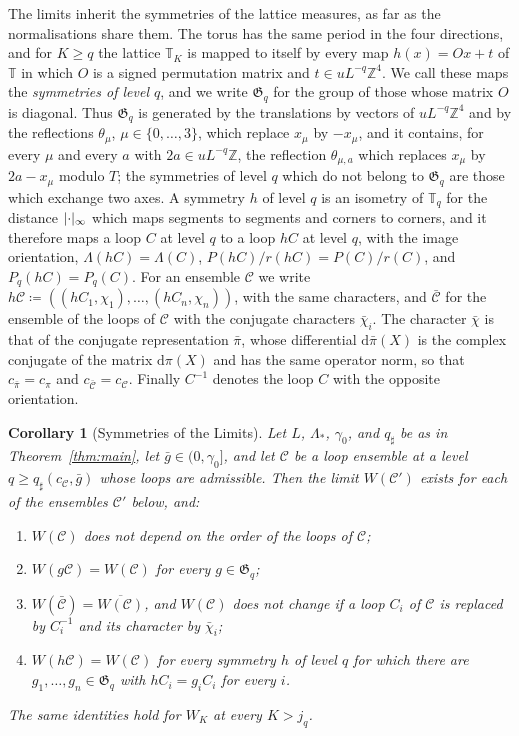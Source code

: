 \documentclass[11pt]{preprint}
\newcommand{\dd}{\mathrm{d}}
\DeclarePairedDelimiter{\abs}{\lvert}{\rvert}
\numberwithin{equation}{section}
\newtheorem{corollary}[theorem]{Corollary}
\theoremstyle{definition}
\theoremstyle{remark}
\theoremstyle{plain}
\begin{document}
The limits inherit the symmetries of the lattice measures, as far as the normalisations share them. The torus has the same period in the four directions, and for $K \geq q$ the lattice $\mathbb T_K$ is mapped to itself by every map $h(x) = Ox + t$ of $\mathbb T$ in which $O$ is a signed permutation matrix and $t \in uL^{-q}\mathbb Z^4$. We call these maps the \emph{symmetries of level $q$}, and we write $\mathfrak G_q$ for the group of those whose matrix $O$ is diagonal. Thus $\mathfrak G_q$ is generated by the translations by vectors of $uL^{-q}\mathbb Z^4$ and by the reflections $\theta_\mu$, $\mu \in \{ 0, \dots, 3 \}$, which replace $x_\mu$ by $-x_\mu$, and it contains, for every $\mu$ and every $a$ with $2a \in uL^{-q}\mathbb Z$, the reflection $\theta_{\mu,a}$ which replaces $x_\mu$ by $2a - x_\mu$ modulo $T$; the symmetries of level $q$ which do not belong to $\mathfrak G_q$ are those which exchange two axes. A symmetry $h$ of level $q$ is an isometry of $\mathbb T_q$ for the distance $\abs{\cdot}_\infty$ which maps segments to segments and corners to corners, and it therefore maps a loop $C$ at level $q$ to a loop $hC$ at level $q$, with the image orientation, $\Lambda(hC) = \Lambda(C)$, $P(hC)/r(hC) = P(C)/r(C)$, and $P_q(hC) = P_q(C)$. For an ensemble $\mathcal C$ we write $h\mathcal C \coloneqq ((hC_1, \chi_1), \dots, (hC_n, \chi_n))$, with the same characters, and $\bar{\mathcal C}$ for the ensemble of the loops of $\mathcal C$ with the conjugate characters $\bar\chi_i$. The character $\bar\chi$ is that of the conjugate representation $\bar\pi$, whose differential $\dd\bar\pi(X)$ is the complex conjugate of the matrix $\dd\pi(X)$ and has the same operator norm, so that $c_{\bar\pi} = c_\pi$ and $c_{\bar{\mathcal C}} = c_{\mathcal C}$. Finally $C^{-1}$ denotes the loop $C$ with the opposite orientation.

\begin{corollary}[Symmetries of the Limits]\label{cor:symmetries}
Let $L$, $\Lambda_*$, $\gamma_0$, and $q_\sharp$ be as in Theorem~\ref{thm:main}, let $\bar g \in (0, \gamma_0]$, and let $\mathcal C$ be a loop ensemble at a level $q \geq q_\sharp(c_{\mathcal C}, \bar g)$ whose loops are admissible. Then the limit $W(\mathcal C')$ exists for each of the ensembles $\mathcal C'$ below, and:
\begin{enumerate}[label=(\roman*)]
\item $W(\mathcal C)$ does not depend on the order of the loops of $\mathcal C$;
\item $W(g\mathcal C) = W(\mathcal C)$ for every $g \in \mathfrak G_q$;
\item $W(\bar{\mathcal C}) = \overline{W(\mathcal C)}$, and $W(\mathcal C)$ does not change if a loop $C_i$ of $\mathcal C$ is replaced by $C_i^{-1}$ and its character by $\bar\chi_i$;
\item $W(h\mathcal C) = W(\mathcal C)$ for every symmetry $h$ of level $q$ for which there are $g_1, \dots, g_n \in \mathfrak G_q$ with $hC_i = g_iC_i$ for every $i$.
\end{enumerate}
The same identities hold for $W_K$ at every $K > j_q$.
\end{corollary}
\end{document}
